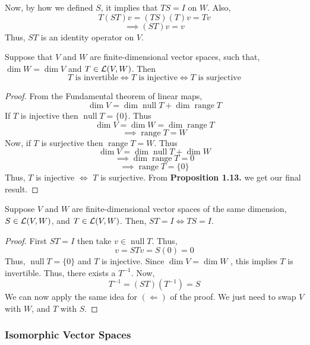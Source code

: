 Now, by how we defined $S$, it implies that $T S = I$ on $W$. Also,
\[ T(S T) v = (T S)(T) v = Tv  \]
\[ \implies (ST)v=v\]
Thus, $ST$ is an identity operator on $V$.

\begin{proposition}
    Suppose that $V$ and $W$ are finite-dimensional vector spaces, such that, $\dim W = \dim V$ and $T \in \operatorname{\mathcal{L}}(V,W)$. Then
    \[ T \text{ is invertible} \iff T \text{ is injective} \iff T \text{ is surjective} \]
\end{proposition}

\begin{proof}
From the Fundamental theorem of linear maps,
    \[ \dim V = \dim \operatorname{null} T + \dim \operatorname{range} T  \]
    If $T$ is injective then $\operatorname{null} T = \{0\}$. Thus
    \[ \dim V = \dim W = \dim \operatorname{range} T \]
    \[ \implies \operatorname{range} T = W \]
Now, if $T$ is surjective then $\operatorname{range} T = W$. Thus
\[ \dim V = \dim \operatorname{null} T  + \dim W\]
\[ \implies \dim \operatorname{range} T = 0 \]
\[ \implies \operatorname{range} T = \{0\} \]    
Thus, $T$ is injective $\iff$ $T$ is surjective. From \textbf{Proposition 1.13.} we get our final result.
\end{proof}


\begin{proposition}
    Suppose $V$ and $W$ are finite-dimensional vector spaces of the same dimension, $S \in \operatorname{\mathcal{L}}(V,W)$, and $T \in \operatorname{\mathcal{L}}(V,W)$. Then,
    $ST=I \iff TS=I$.
\end{proposition}

\begin{proof}
    First $ST=I$ then take $v \in \operatorname{null} T$. Thus,
    \[ v=STv = S(0)=0 \]
    Thus, $\operatorname{null} T = \{0\}$ and $T$ is injective. Since $\dim V = \dim W$ , this implies $T$ is invertible.
    Thus, there exists a $T^{-1}$. Now,
    \[ T^{-1}=(ST)(T^{-1}) =  S\] 
    We can now apply the same idea for $(\Leftarrow)$ of the proof. We just need to swap $V$ with $W$, and $T$ with $S$.
\end{proof}

\subsubsection{Isomorphic Vector Spaces}

